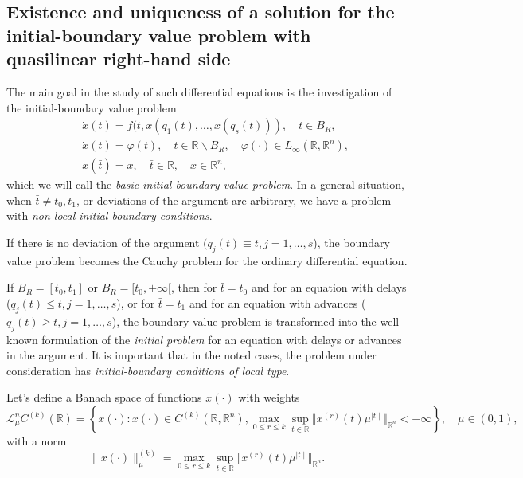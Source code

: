 \documentclass[
11pt,%
tightenlines,%
twoside,%
onecolumn,%
nofloats,%
nobibnotes,%
nofootinbib,%
superscriptaddress,%
noshowpacs,%
centertags,aps]%
{revtex4}
\begin{document}
\subsection{Existence and uniqueness of a solution for the initial-boundary value problem with quasilinear right-hand side}
The main goal in the study of such differential equations is the investigation of the initial-boundary value problem
\begin{eqnarray}
&&\dot x(t)=f(t,x(q_1(t),\ldots,x(q_s(t))),\quad t\in B_R,\label{eq:ibvp1}\\
&&\dot x(t)=\varphi(t),\quad t\in \mathbb R\backslash B_R,\quad \varphi(\cdot)\in L_\infty(\mathbb R,\mathbb R^n),\label{eq:ibvp2}\\
&&x(\bar t)=\bar x,\quad \bar t\in \mathbb R,\quad \bar x\in \mathbb R^n,\label{eq:ibvp3}
\end{eqnarray}
which we will call the {\it basic initial-boundary value problem}. In a general situation, when $\bar t \neq t_0,t_1$, or deviations of the argument are arbitrary, we have a problem with {\it non-local initial-boundary conditions}.

If there is no deviation of the argument $(q_j(t)\equiv t, j=1,\ldots,s$), the boundary value problem becomes the Cauchy problem for the ordinary differential equation.

If $B_R=[t_0,t_1]$ or $B_R=[t_0,+\infty[$, then for $\bar t=t_0$ and for an equation with delays ($q_j(t)\le t, j=1,\ldots,s$), or for $\bar t=t_1$ and for an equation with advances ($q_j(t)\geq t, j=1,\ldots,s$), the boundary value problem is transformed into the well-known formulation of the {\it initial problem} for an equation with delays or advances in the argument. It is important that in the noted cases, the problem under consideration has {\it initial-boundary conditions of local type}.

Let's define a Banach space of functions $x(\cdot)$ with weights
\[
\mathcal L^n_{\mu}C^{(k)}(\mathbb R)=\left\{x(\cdot): x(\cdot)\in C^{(k)}\left(\mathbb R,\mathbb R^n\right),\max_{0\le r\le k}\sup_{t\in\mathbb R}\Vert x^{(r)}(t)\mu^{\mid t\mid }\Vert_{\mathbb R^n}<+\infty\right\},\quad \mu \in (0,1),
\]
with a norm
\[
\|x(\cdot)\|_{\mu}^{(k)}=\max_{0\le r\le k}\sup_{t\in\mathbb R}\Vert x^{(r)}(t)\mu^{\mid t\mid }\Vert_{\mathbb R^n}.
\]
\end{document}
